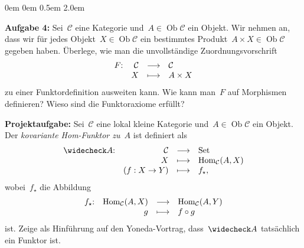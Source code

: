 \documentclass[a4paper,ngerman]{scrartcl}
\theoremstyle{definition}
\theoremstyle{plain}
\theoremstyle{remark}
\newcommand{\C}{\mathcal{C}}
\newcommand{\Hom}{\mathrm{Hom}}
\newcommand{\Set}{\mathrm{Set}}
\DeclareMathOperator{\Ob}{Ob}
\begin{document}
\begin{list}{}{0em \leftmargin0em \itemindent0.5em \itemsep 2.0em}
\item[\textbf{Aufgabe 4:}]
Sei~$\C$ eine Kategorie und~$A \in \Ob \C$ ein Objekt. Wir nehmen an, dass wir
für jedes Objekt~$X \in \Ob \C$ ein bestimmtes Produkt~$A \times X \in \Ob \C$
gegeben haben. Überlege, wie man die unvollständige Zuordnungsvorschrift
\[ \begin{array}{@{}rrcl@{}}
  F{:} & \C &\longrightarrow& \C \\
  & X &\longmapsto& A \times X
\end{array} \]
zu einer Funktordefinition ausweiten kann. Wie kann man~$F$ auf Morphismen
definieren? Wieso sind die Funktoraxiome erfüllt?

\small
\item[\textbf{Projektaufgabe:}]
Sei~$\C$ eine lokal kleine Kategorie und~$A \in \Ob \C$ ein Objekt. Der \emph{kovariante
Hom-Funktor zu~$A$} ist definiert als
\[ \begin{array}{@{}rrcl@{}}
  \widecheck A{:} & \C &\longrightarrow& \Set \\
  & X &\longmapsto& \Hom_\C(A,X) \\
  & (f: X \to Y) &\longmapsto& f_\star,
\end{array} \]
wobei~$f_\star$ die Abbildung
\[ \begin{array}{@{}rrcl@{}}
  f_\star{:} & \Hom_\C(A,X) &\longrightarrow& \Hom_\C(A,Y) \\
  & g &\longmapsto& f \circ g
\end{array} \]
ist. Zeige als Hinführung auf den Yoneda-Vortrag, dass~$\widecheck A$ tatsächlich
ein Funktor ist.
\end{list}
\end{document}
